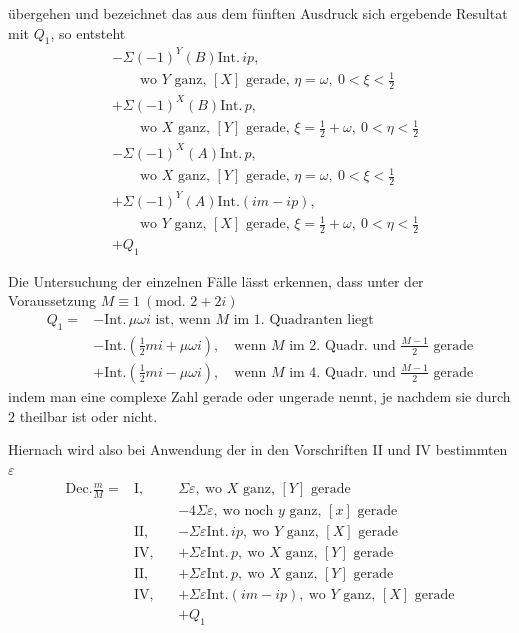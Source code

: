 %
übergehen und bezeichnet das aus dem fünften Ausdruck sich ergebende Resultat mit $Q_1$, so entsteht
\[
\begin{aligned}
&-\Sigma(-1)^Y(B)\mathrm{Int.}\,ip,\\
&\qquad\text{wo }Y\text{ ganz, }[X]\text{ gerade, }\eta=\omega,\ 0<\xi<\tfrac12\\
&+\Sigma(-1)^X(B)\mathrm{Int.}\,p,\\
&\qquad\text{wo }X\text{ ganz, }[Y]\text{ gerade, }\xi=\tfrac12+\omega,\ 0<\eta<\tfrac12\\
&-\Sigma(-1)^X(A)\mathrm{Int.}\,p,\\
&\qquad\text{wo }X\text{ ganz, }[Y]\text{ gerade, }\eta=\omega,\ 0<\xi<\tfrac12\\
&+\Sigma(-1)^Y(A)\mathrm{Int.}(im-ip),\\
&\qquad\text{wo }Y\text{ ganz, }[X]\text{ gerade, }\xi=\tfrac12+\omega,\ 0<\eta<\tfrac12\\
&+Q_1
\end{aligned}
\]

Die Untersuchung der einzelnen Fälle lässt erkennen, dass unter der Voraussetzung $M\equiv1\ (\text{mod. }2+2i)$
\[
\begin{aligned}
Q_1={}&-\mathrm{Int.}\,\mu\omega i\text{ ist, wenn }M\text{ im }1.\text{ Quadranten liegt}\\
&-\mathrm{Int.}(\tfrac12mi+\mu\omega i),\quad\text{wenn }M\text{ im }2.\text{ Quadr. und }\frac{M-1}{2}\text{ gerade}\\
&+\mathrm{Int.}(\tfrac12mi-\mu\omega i),\quad\text{wenn }M\text{ im }4.\text{ Quadr. und }\frac{M-1}{2}\text{ gerade}
\end{aligned}
\]
indem man eine complexe Zahl gerade oder ungerade nennt, je nachdem sie durch $2$ theilbar ist oder nicht.

Hiernach wird also bei Anwendung der in den Vorschriften II und IV bestimmten $\varepsilon$
\[
\begin{aligned}
\mathrm{Dec.}\frac mM={}&\mathrm{I},& &\Sigma\varepsilon,\ \text{wo }X\text{ ganz, }[Y]\text{ gerade}\\
&&&-4\Sigma\varepsilon,\ \text{wo noch }y\text{ ganz, }[x]\text{ gerade}\\
&\mathrm{II},&&-\Sigma\varepsilon\mathrm{Int.}\,ip,\ \text{wo }Y\text{ ganz, }[X]\text{ gerade}\\
&\mathrm{IV},&&+\Sigma\varepsilon\mathrm{Int.}\,p,\ \text{wo }X\text{ ganz, }[Y]\text{ gerade}\\
&\mathrm{II},&&+\Sigma\varepsilon\mathrm{Int.}\,p,\ \text{wo }X\text{ ganz, }[Y]\text{ gerade}\\
&\mathrm{IV},&&+\Sigma\varepsilon\mathrm{Int.}(im-ip),\ \text{wo }Y\text{ ganz, }[X]\text{ gerade}\\
&&&+Q_1
\end{aligned}
\]

